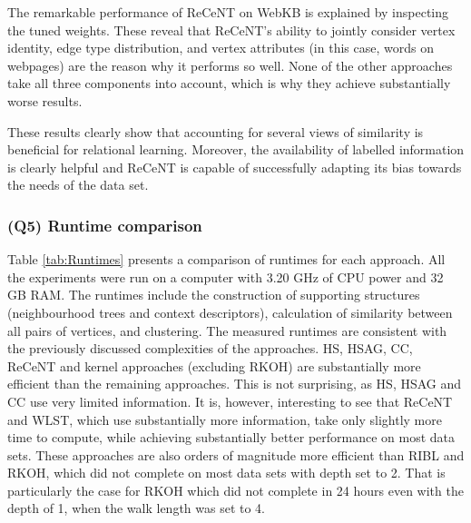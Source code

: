 The remarkable performance of ReCeNT on WebKB is explained by inspecting the tuned weights.  These reveal that ReCeNT's ability to jointly consider vertex identity, edge type distribution, and vertex attributes (in this case, words on webpages) are the reason why it performs so well.  None of the other approaches take all three components into account, which is why they achieve substantially worse results.

These results clearly show that accounting for several views of similarity is beneficial for relational learning.
Moreover, the availability of labelled information is clearly helpful and ReCeNT is capable of successfully adapting its bias towards the needs of the data set. 
\vspace{2pt}




\subsubsection{\textbf{(Q5) Runtime comparison}}

Table \ref{tab:Runtimes} presents a comparison of runtimes for each approach.
All the experiments were run on a computer with 3.20 GHz of CPU power and 32 GB RAM.
The runtimes include the construction of supporting structures (neighbourhood trees and context descriptors), calculation of similarity between all pairs of vertices, and clustering.
The measured runtimes are consistent with the previously discussed complexities of the approaches.
HS, HSAG, CC, ReCeNT and kernel approaches (excluding RKOH) are substantially more efficient than the remaining approaches.
This is not surprising, as HS, HSAG and CC  use very limited information.
It is, however, interesting to see that ReCeNT and WLST,  which use substantially more information, take only slightly more time to compute, while achieving substantially better performance on most data sets.  
These approaches are also orders of magnitude more efficient than RIBL and RKOH, which did not complete on most data sets with depth set to 2.
That is particularly the case for RKOH which did not complete in 24 hours even with the depth of 1, when the walk length was set to 4.
\vspace{2pt}


